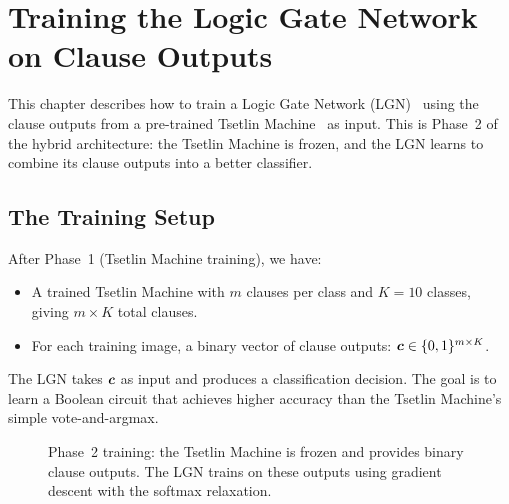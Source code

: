 \chapter{Training the Logic Gate Network on Clause Outputs}
\label{ch:lgn-training}

This chapter describes how to train a Logic Gate Network (LGN)~\cite{petersen2022difflogic} using
the clause outputs from a pre-trained Tsetlin Machine~\cite{granmo2018tsetlin} as input. This
is Phase~2 of the hybrid architecture: the Tsetlin Machine is frozen,
and the LGN learns to combine its clause outputs into a better
classifier.


\section{The Training Setup}
\label{sec:lgn-setup}

After Phase~1 (Tsetlin Machine training), we have:
\begin{itemize}
  \item A trained Tsetlin Machine with $m$ clauses per class and
    $K = 10$ classes, giving $m \times K$ total clauses.
  \item For each training image, a binary vector of clause outputs:
    $\bm{c} \in \{0, 1\}^{m \times K}$.
\end{itemize}

The LGN takes $\bm{c}$ as input and produces a classification
decision. The goal is to learn a Boolean circuit that achieves higher
accuracy than the Tsetlin Machine's~\cite{granmo2018tsetlin} simple vote-and-argmax.

\begin{figure}[htbp]
\centering
{}
\caption{Phase~2 training: the Tsetlin Machine is frozen and provides
  binary clause outputs. The LGN trains on these outputs using
  gradient descent with the softmax relaxation.}
\label{fig:lgn-setup}
\end{figure}


